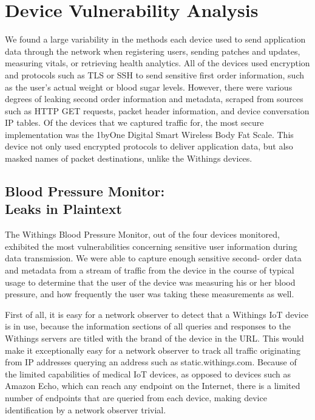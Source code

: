 \section{Device Vulnerability Analysis}

We found a large variability in the methods each device used to send
application data through the network when registering users, sending patches
and updates, measuring vitals, or retrieving health analytics. All of the
devices used encryption and protocols such as TLS or SSH to send sensitive
first order information, such as the user's actual weight or blood sugar
levels. However, there were various degrees of leaking second order
information and metadata, scraped from sources such as HTTP GET requests,
packet header information, and device conversation IP tables. Of the devices
that we captured traffic for, the most secure implementation was the 1byOne
Digital Smart Wireless Body Fat Scale. This device not only used encrypted
protocols to deliver application data, but also masked names of packet
destinations, unlike the Withings devices.

\subsection{Blood Pressure Monitor: \\ Leaks in Plaintext}

The Withings Blood Pressure Monitor, out of the four devices monitored,
exhibited the most vulnerabilities concerning sensitive user information
during data transmission. We were able to capture enough sensitive second-
order data and metadata from a stream of traffic from the device in the course
of typical usage to determine that the user of the device was measuring his or
her blood pressure, and how frequently the user was taking these measurements as
well.

First of all, it is easy for a network observer to detect that a Withings IoT
device is in use, because the information sections of all queries and
responses to the Withings servers are titled with the brand of the device in
the URL. This would make it exceptionally easy for a network observer to track
all traffic originating from IP addresses querying an address such as
static.withings.com. Because of the limited capabilities of medical IoT
devices, as opposed to devices such as Amazon Echo, which can reach any
endpoint on the Internet, there is a limited number of endpoints that are
queried from each device, making device identification by a network observer
trivial.

